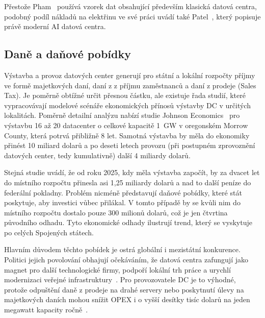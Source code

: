 Přestože Pham~\cite{pham_data_2017} používá vzorek dat obsahující především klasická datová centra, podobný podíl nákladů na elektřinu ve své práci uvádí také Patel~\cite[s.~955]{pratikkumar_dilipkumar_patel_artificial_2025}, který popisuje právě moderní AI datová centra.

\subsection{Daně a daňové pobídky}
\label{subsec:daně}

Výstavba a provoz datových center generují pro státní a lokální rozpočty příjmy ve formě majetkových daní, daní z z příjmu zaměstnanců a daní z prodeje (Sales Tax). Je poměrně obtížné určit přesnou částku, ale existuje řada studií, které vypracovávají modelové scénáře ekonomických přínosů výstavby DC v určitých lokalitách. Poměrně detailní analýzu nabízí studie Johnson Economics~\cite{johnson_economics_economic_2025} pro výstavbu 16 až 20 datacenter o celkové kapacitě 1~GW v oregonském Morrow County, která potrvá přibližně 8 let. Samotná výstavba by měla do ekonomiky přinést 10 miliard dolarů a po deseti letech provozu (při postupném zprovoznění datových center, tedy kumulativně) další 4 miliardy dolarů. 

Stejná studie uvádí, že od roku 2025, kdy měla výstavba započít, by za dvacet let do místního rozpočtu přinesla asi 1,25 miliardy dolarů a nad to další peníze do federální pokladny. Problém nicméně představují daňové pobídky, které stát poskytuje, aby investici vůbec přilákal. V tomto případě by se kvůli nim do místního rozpočtu dostalo pouze 300 milionů dolarů, což je jen čtvrtina původního odhadu. Tyto ekonomické odhady ilustrují trend, který se vyskytuje po celých Spojených státech.

Hlavním důvodem těchto pobídek je ostrá globální i mezistátní konkurence. Politici jejich povolování obhajují očekáváním, že datová centra zafungují jako magnet pro další technologické firmy, podpoří lokální trh práce a urychlí modernizaci veřejné infrastruktury~\cite{gargano_subsidizing_2025}. Pro provozovatele DC je to výhodné, protože odpuštění daně z prodeje na drahé servery nebo poskytnutí úlevy na majetkových daních mohou snížit OPEX i o vyšší desítky tisíc dolarů na jeden megawatt kapacity ročně~\cite[s.~27]{gargano_subsidizing_2025}.

